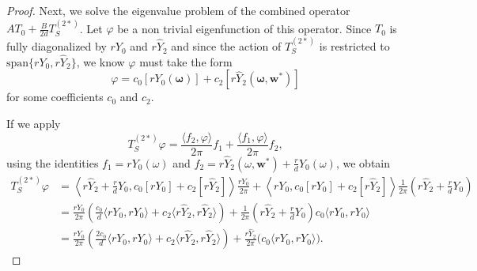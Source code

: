 \begin{proof}
    Next, we solve the eigenvalue problem of the combined operator $AT_0 +\frac{B}{2d} T_{S}^{(2*)}$. Let $\varphi$ be a non trivial eigenfunction of this operator. Since $T_0$ is fully diagonalized by $r Y_0$ and $r \hat{Y}_2$ and since the action of $T_{S}^{(2*)}$ is restricted to $\text{span}\{r Y_0, r \hat{Y}_2\}$, we know $\varphi$ must take the form
    \[
        \varphi = c_0 [r Y_0(\bm \omega)] + c_2[r \hat{Y}_2(\bm \omega, \bm w^*)]
    \]
    for some coefficients $c_0$ and $c_2$.
    
    If we apply
    \[
        T_{S}^{(2*)}\varphi = \frac{\langle f_2, \varphi \rangle}{2 \pi}f_1 + \frac{ \langle f_1, \varphi \rangle}{2 \pi}f_2,
    \]
    using the identities $f_1 = r Y_0(\omega)$ and $f_2 = r \hat{Y}_2(\omega, \bm w^*) + \frac{r}{d}Y_0(\omega)$, we obtain
    \begin{align*}
        T_{S}^{(2*)}\varphi &= \left\langle r \hat{Y}_2 + \frac{r}{d} Y_0, c_0[r Y_0] + c_2[r \hat{Y}_2]\right\rangle \frac{r Y_0}{2 \pi}  + \left\langle r Y_0,  c_0[r Y_0] + c_2[r \hat{Y}_2]\right\rangle\frac{1}{2 \pi}\left( r \hat{Y}_2 + \frac{r}{d} Y_0 \right)\\
        &= \frac{r Y_0}{2 \pi} \left( \frac{c_0}{d} \langle r Y_0, r Y_0\rangle + c_2 \langle r \hat{Y}_2, r \hat{Y}_2\rangle\right) + \frac{1}{ 2 \pi}\left( r \hat{Y}_2 + \frac{r}{d} Y_0 \right)c_0\langle r Y_0, r Y_0\rangle\\
        &= \frac{r Y_0}{2 \pi}\left( \frac{2c_0}{d} \langle r Y_0, r Y_0\rangle + c_2 \langle r \hat{Y}_2, r \hat{Y}_2\rangle\right) + \frac{r \hat{Y}_2}{2 \pi} \Big(c_0\langle r Y_0, r Y_0\rangle \Big).
    \end{align*}


\end{proof}
